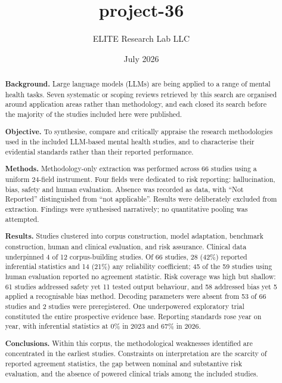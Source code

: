 \documentclass[11pt]{article}
\title{project-36}
\author{ELITE Research Lab LLC}
\date{July 2026}
\begin{document}
	
	\maketitle
	
	\begin{abstract}
		\noindent\textbf{Background.} Large language models (LLMs) are being applied to a range of mental
		health tasks. Seven systematic or scoping reviews retrieved by this search are organised around
		application areas rather than methodology, and each closed its search before the majority of the
		studies included here were published.
		
		\noindent\textbf{Objective.} To synthesise, compare and critically appraise the research
		methodologies used in the included LLM-based mental health studies, and to characterise their
		evidential standards rather than their reported performance.
		
		\noindent\textbf{Methods.} Methodology-only extraction was performed across 66 studies
		using a uniform 24-field instrument.
		Four fields were dedicated to risk reporting: hallucination, bias, safety and human evaluation.
		Absence was recorded as data, with ``Not Reported'' distinguished from ``not applicable''. Results
		were deliberately excluded from extraction. Findings were synthesised narratively; no quantitative
		pooling was attempted.
		
		\noindent\textbf{Results.} Studies clustered into corpus construction, model adaptation, benchmark
		construction, human and clinical evaluation, and risk assurance. Clinical data underpinned 4 of 12
		corpus-building studies. Of 66 studies, 28 (42\%) reported inferential statistics and 14 (21\%) any
		reliability coefficient; 45 of the 59 studies using human evaluation reported no agreement statistic.
		Risk coverage was high but shallow: 61 studies addressed safety yet 11 tested output behaviour, and
		58 addressed bias yet 5 applied a recognisable bias method. Decoding parameters were absent from 53
		of 66 studies and 2 studies were preregistered. One underpowered exploratory trial constituted the
		entire prospective evidence base. Reporting standards rose year on year, with inferential statistics
		at 0\% in 2023 and 67\% in 2026.
		
		\noindent\textbf{Conclusions.} Within this corpus, the methodological weaknesses identified are
		concentrated in the earliest studies. Constraints on interpretation are the scarcity of reported
		agreement statistics, the gap between nominal and substantive risk evaluation, and the absence of
		powered clinical trials among the included studies.
	\end{abstract}
	
\end{document}
